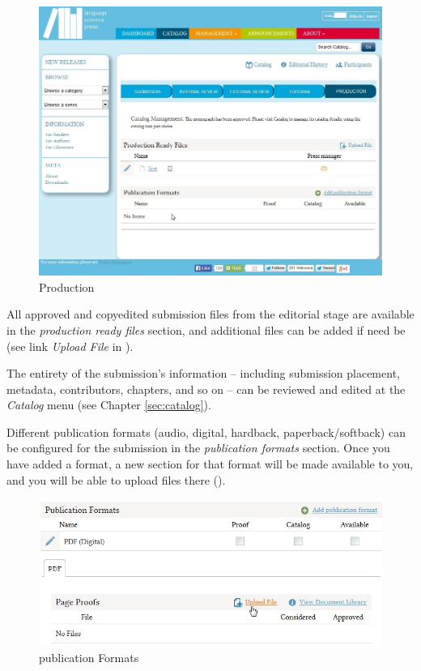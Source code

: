 \begin{figure}[h] \centering
\includegraphics[width=1\textwidth]{./img/production.jpg} \caption{Production}
\label{fig:production}
\end{figure}


All approved and copyedited submission files from the editorial stage are available in the \textit{production ready files} section, and additional files can be added if need be (see link \textit{Upload File} in  ).

The entirety of the submission's information -- including submission placement, metadata, contributors, chapters, and so on -- can be reviewed and edited at the \textit{Catalog} menu (see Chapter \ref{sec:catalog}).

Different publication formats (audio, digital, hardback, paperback/softback) can be configured for the submission in the \textit{publication formats} section. Once you have added a format, a new section for that format will be made available to you, and you will be able to upload files there (). 

\begin{figure}[h] \centering
\includegraphics[width=1\textwidth]{./img/publicationFormats.jpg} \caption{publication Formats}
\label{fig:publicationFormats}
\end{figure}

